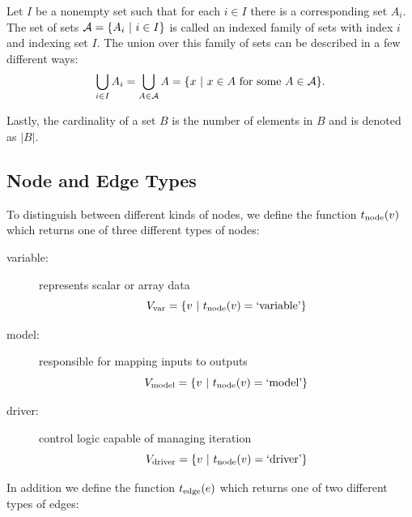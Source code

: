   Let $I$ be a nonempty set such that for each $i \in I$ there is a corresponding set $A_i$. 
  The set of sets $\mathcal A = \{A_i \ | \  i \in I\}$ is called an indexed family of sets with index $i$ and 
  indexing set $I$\cite{smith2006}. 
  The union over this family of sets can be described in a few different ways:
  \begin{equation}
  \bigcup_{i \in I} A_i = \bigcup_{A \in \mathcal A} A = \{x \ | \  x \in A \textrm{ for some } A \in \mathcal A\}.
  \end{equation}

  Lastly, the cardinality of a set $B$ is the number of elements in $B$ and is denoted as $|B|$.

\subsection{Node and Edge Types}
  \label{ss:types}
  To distinguish between different kinds of nodes, we define the function 
  $t_{\textrm{node}}(v)$ which returns one of three different types of nodes: 

  \begin{description}
    \item[variable:] represents scalar or array data
    \begin{equation} 
      V_{\textrm{var}} = \{v \ | \  t_{\textrm{node}}(v) = \textrm{`variable'}\}
    \end{equation}

    \item[model:] responsible for mapping inputs to outputs
    \begin{equation} 
      V_{\textrm{model}} = \{v \ | \  t_{\textrm{node}}(v) = \textrm{`model'}\}
    \end{equation}

    \item[driver:] control logic capable of managing iteration
    \begin{equation} 
      V_{\textrm{driver}} = \{v \ | \  t_{\textrm{node}}(v) = \textrm{`driver'}\}
    \end{equation}

  \end{description}


  In addition we define the function $t_{\textrm{edge}}(e)$ which returns one of 
  two different types of edges: 

